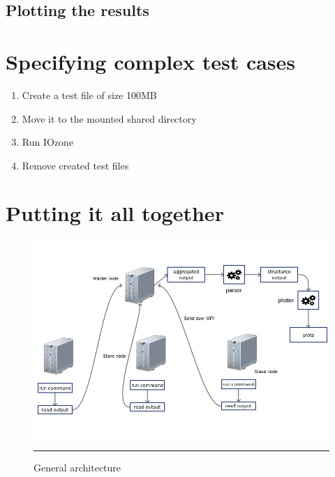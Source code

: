 
\subsection{Plotting the results}





\section{Specifying complex test cases}


\begin{enumerate}

\item Create a test file of size 100MB
\item Move it to the mounted shared directory
\item Run IOzone
\item Remove created test files

\end{enumerate}



\section{Putting it all together}

\begin{figure}[H]
  \centering
    \includegraphics[scale=0.5]{Figures/architecture.png}
    \rule{25em}{0.5pt}
  \caption[General architecture]{General architecture}
  \label{fig:architecture}
\end{figure}


